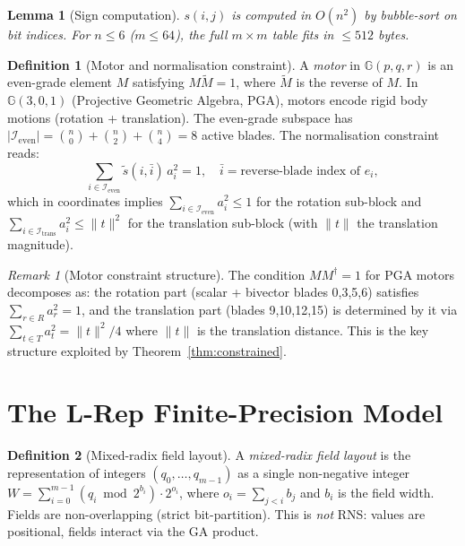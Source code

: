 \documentclass[11pt,a4paper]{article}
\theoremstyle{definition}
\newtheorem{definition}{Definition}[section]
\theoremstyle{plain}
\newtheorem{lemma}{Lemma}[section]
\theoremstyle{remark}
\newtheorem{remark}{Remark}[section]
\newcommand{\GA}{\mathbb{G}}
\begin{document}
\begin{lemma}[Sign computation]
\label{lem:sign}
$s(i,j)$ is computed in $O(n^2)$ by bubble-sort on bit indices.
For $n\le6$ ($m\le64$), the full $m\times m$ table fits in $\le512$ bytes.
\end{lemma}

\begin{definition}[Motor and normalisation constraint]
\label{def:motor}
A \emph{motor} in $\GA(p,q,r)$ is an even-grade element $M$ satisfying
$M\tilde{M}=1$, where $\tilde{M}$ is the reverse of $M$.
In $\GA(3,0,1)$ (Projective Geometric Algebra, PGA), motors encode rigid
body motions (rotation + translation).
The even-grade subspace has $|\mathcal{I}_{\mathrm{even}}|=\binom{n}{0}+\binom{n}{2}+\binom{n}{4}=8$ active blades.
The normalisation constraint reads:
\begin{equation}\label{eq:motor-norm}
  \sum_{i\in\mathcal{I}_{\mathrm{even}}} \tilde{s}(i,\bar{i})\,a_i^2 = 1,
  \quad \bar{i} = \text{reverse-blade index of } e_i,
\end{equation}
which in coordinates implies $\sum_{i\in\mathcal{I}_{\mathrm{even}}} a_i^2 \le 1$
for the rotation sub-block and $\sum_{i\in\mathcal{I}_{\mathrm{trans}}} a_i^2 \le \|t\|^2$
for the translation sub-block (with $\|t\|$ the translation magnitude).
\end{definition}

\begin{remark}[Motor constraint structure]
The condition $MM^\dagger=1$ for PGA motors decomposes as: the rotation
part (scalar + bivector blades 0,3,5,6) satisfies $\sum_{r\in R}a_r^2=1$,
and the translation part (blades 9,10,12,15) is determined by it via
$\sum_{t\in T}a_t^2 = \|t\|^2/4$ where $\|t\|$ is the translation distance.
This is the key structure exploited by Theorem~\ref{thm:constrained}.
\end{remark}

\section{The L-Rep Finite-Precision Model}
\label{sec:model}

\begin{definition}[Mixed-radix field layout]
\label{def:mixed-radix}
A \emph{mixed-radix field layout} is the representation of integers
$(q_0,\ldots,q_{m-1})$ as a single non-negative integer
$W=\sum_{i=0}^{m-1}(q_i\bmod 2^{b_i})\cdot2^{o_i}$,
where $o_i=\sum_{j<i}b_j$ and $b_i$ is the field width.
Fields are non-overlapping (strict bit-partition).
This is \emph{not} RNS: values are positional, fields interact via the
GA product.
\end{definition}
\end{document}
